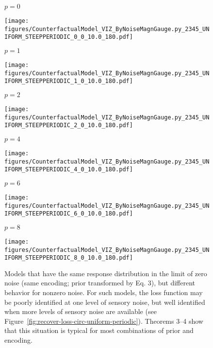 \documentclass[si.tex]{subfiles}
\begin{document}



\begin{figure}


\begin{center}

$p=0$

\texttt{[image: figures/CounterfactualModel\_VIZ\_ByNoiseMagnGauge.py\_2345\_UNIFORM\_STEEPPERIODIC\_0\_0\_10.0\_180.pdf]}


$p=1$

\texttt{[image: figures/CounterfactualModel\_VIZ\_ByNoiseMagnGauge.py\_2345\_UNIFORM\_STEEPPERIODIC\_1\_0\_10.0\_180.pdf]}


$p=2$

\texttt{[image: figures/CounterfactualModel\_VIZ\_ByNoiseMagnGauge.py\_2345\_UNIFORM\_STEEPPERIODIC\_2\_0\_10.0\_180.pdf]}

$p=4$

\texttt{[image: figures/CounterfactualModel\_VIZ\_ByNoiseMagnGauge.py\_2345\_UNIFORM\_STEEPPERIODIC\_4\_0\_10.0\_180.pdf]}

$p=6$


\texttt{[image: figures/CounterfactualModel\_VIZ\_ByNoiseMagnGauge.py\_2345\_UNIFORM\_STEEPPERIODIC\_6\_0\_10.0\_180.pdf]}

$p=8$


\texttt{[image: figures/CounterfactualModel\_VIZ\_ByNoiseMagnGauge.py\_2345\_UNIFORM\_STEEPPERIODIC\_8\_0\_10.0\_180.pdf]}

\end{center}

\begin{comment}
for i in {0,1,2,4,6,8} ; do python3 CounterfactualModel_VIZ_ByNoiseMagnGauge.py $i 0 10.0 180 UNIFORM STEEPPERIODIC 2345 ; done
\end{comment}
\caption{Models that have the same response distribution in the limit of zero noise (same encoding; prior transformed by Eq. 3), but different behavior for nonzero noise.
For such models, the loss function may be poorly identified at one level of sensory noise, but well identified when more levels of sensory noise are available (see Figure~\ref{fig:recover-loss-circ-uniform-periodic}).
Theorems 3--4 show that this situation is typical for most combinations of prior and encoding.
}\label{fig:circular-gauge}
\end{figure}
\end{document}
